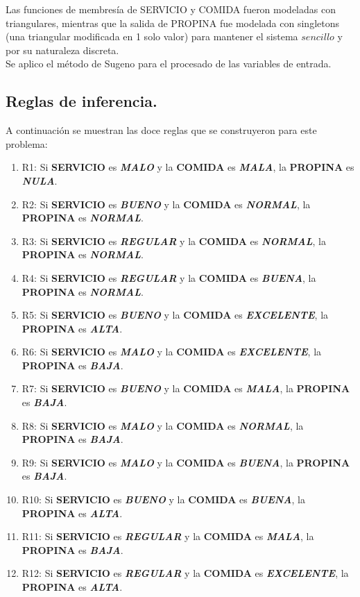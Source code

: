 \documentclass[11pt, letterpaper]{article}
\begin{document}
Las funciones de membresía de SERVICIO y COMIDA fueron modeladas con triangulares, mientras que la salida de PROPINA fue modelada con singletons (una triangular modificada en 1 solo valor) para mantener el sistema $sencillo$ y por su naturaleza discreta. \\

Se aplico el método de Sugeno para el procesado de las variables de entrada. 

\newpage

\subsection{Reglas de inferencia.}

A continuación se muestran las doce reglas que se construyeron para este problema:

\begin{enumerate}
	\item R1: Si \textbf{SERVICIO} es \textbf{\textit{MALO}} y la \textbf{COMIDA} es \textbf{\textit{MALA}}, la \textbf{PROPINA} es \textbf{\textit{NULA}}.
	\item R2: Si \textbf{SERVICIO} es \textbf{\textit{BUENO}} y la \textbf{COMIDA} es \textbf{\textit{NORMAL}}, la \textbf{PROPINA} es \textbf{\textit{NORMAL}}.
	\item R3: Si \textbf{SERVICIO} es \textbf{\textit{REGULAR}} y la \textbf{COMIDA} es \textbf{\textit{NORMAL}}, la \textbf{PROPINA} es \textbf{\textit{NORMAL}}.
	\item R4: Si \textbf{SERVICIO} es \textbf{\textit{REGULAR}} y la \textbf{COMIDA} es \textbf{\textit{BUENA}}, la \textbf{PROPINA} es \textbf{\textit{NORMAL}}.
	\item R5: Si \textbf{SERVICIO} es \textbf{\textit{BUENO}} y la \textbf{COMIDA} es \textbf{\textit{EXCELENTE}}, la \textbf{PROPINA} es \textbf{\textit{ALTA}}.
	\item R6: Si \textbf{SERVICIO} es \textbf{\textit{MALO}} y la \textbf{COMIDA} es \textbf{\textit{EXCELENTE}}, la \textbf{PROPINA} es \textbf{\textit{BAJA}}.
	\item R7: Si \textbf{SERVICIO} es \textbf{\textit{BUENO}} y la \textbf{COMIDA} es \textbf{\textit{MALA}}, la \textbf{PROPINA} es \textbf{\textit{BAJA}}.
	\item R8: Si \textbf{SERVICIO} es \textbf{\textit{MALO}} y la \textbf{COMIDA} es \textbf{\textit{NORMAL}}, la \textbf{PROPINA} es \textbf{\textit{BAJA}}.
	\item R9: Si \textbf{SERVICIO} es \textbf{\textit{MALO}} y la \textbf{COMIDA} es \textbf{\textit{BUENA}}, la \textbf{PROPINA} es \textbf{\textit{BAJA}}.
	\item R10: Si \textbf{SERVICIO} es \textbf{\textit{BUENO}} y la \textbf{COMIDA} es \textbf{\textit{BUENA}}, la \textbf{PROPINA} es \textbf{\textit{ALTA}}.
	\item R11: Si \textbf{SERVICIO} es \textbf{\textit{REGULAR}} y la \textbf{COMIDA} es \textbf{\textit{MALA}}, la \textbf{PROPINA} es \textbf{\textit{BAJA}}.
	\item R12: Si \textbf{SERVICIO} es \textbf{\textit{REGULAR}} y la \textbf{COMIDA} es \textbf{\textit{EXCELENTE}}, la \textbf{PROPINA} es \textbf{\textit{ALTA}}.
\end{enumerate}
\end{document}
